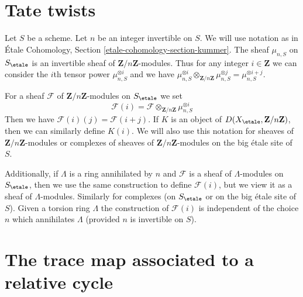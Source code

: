 \section{Tate twists}
\label{section-tate-twists}

\noindent
Let $S$ be a scheme. Let $n$ be an integer invertible on $S$.
We will use notation as in
\'Etale Cohomology, Section \ref{etale-cohomology-section-kummer}.
The sheaf $\mu_{n, S}$ on $S_\etale$ is an invertible sheaf
of $\mathbf{Z}/n\mathbf{Z}$-modules. Thus for any integer $i \in \mathbf{Z}$
we can consider the $i$th tensor power $\mu_{n, S}^{\otimes i}$
and we have
$\mu_{n, S}^{\otimes i} \otimes_{\mathbf{Z}/n\mathbf{Z}}
\mu_{n, S}^{\otimes j} = \mu_{n, S}^{\otimes i + j}$.

\medskip\noindent
For a sheaf $\mathcal{F}$ of $\mathbf{Z}/n\mathbf{Z}$-modules on $S_\etale$
we set
$$
\mathcal{F}(i) = \mathcal{F} \otimes_{\mathbf{Z}/n\mathbf{Z}}
\mu_{n, S}^{\otimes i}
$$
Then we have $\mathcal{F}(i)(j) = \mathcal{F}(i + j)$. If $K$ is an
object of $D(X_\etale, \mathbf{Z}/n\mathbf{Z})$, then we can similarly
define $K(i)$. We will also use this notation for sheaves of
$\mathbf{Z}/n\mathbf{Z}$-modules or complexes of sheaves of
$\mathbf{Z}/n\mathbf{Z}$-modules on the big \'etale site of $S$.

\medskip\noindent
Additionally, if $\Lambda$ is a ring annihilated by $n$ and
$\mathcal{F}$ is a sheaf of $\Lambda$-modules on $S_\etale$,
then we use the same construction to define $\mathcal{F}(i)$,
but we view it as a sheaf of $\Lambda$-modules. Similarly
for complexes (on $S_\etale$ or on the big \'etale site of $S$).
Given a torsion ring $\Lambda$ the construction of $\mathcal{F}(i)$
is independent of the choice $n$ which annihilates $\Lambda$
(provided $n$ is invertible on $S$).





\section{The trace map associated to a relative cycle}
\label{section-trace-relative-cycle}

